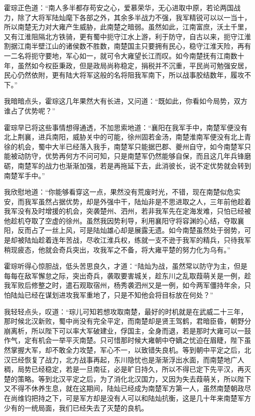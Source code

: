霍琮正色道：“南人多半都存苟安之心，爱慕荣华，无心进取中原，若论两国战力，除了大将军陆灿麾下各部之外，其余多半战力不强，我军精锐可以以一当十，所以南楚无力对大雍产生威胁，此南楚之暗弱。虽然如此，江南富庶，沃土千里，又有江淮阻隔北方铁骑，更有蜀中扼守江水上游，利于防守，自古以来，扼守江淮割据江南半壁江山的诸侯数不胜数，南楚国主只要拥有民心，稳守江淮天险，再有一二名将扼守要地，军心如一，就可令大雍望长江而叹。如今南楚抚有江南数十年，虽然如今权臣秉政，但是政局尚称稳定，捐税并不沉重，平民尚可勉强安居，民心仍然依附，更有陆大将军这般的名将阻我军南下，所以战事胶结数年，履攻不下。”

我暗暗点头，霍琮这几年果然大有长进，又问道：“既如此，你看如今局势，双方谁占了优势呢？”

霍琮早已将这些事情想得通透，不加思索地道：“襄阳在我军手中，南楚军便没有北上荆襄，进兵南阳，威胁关中的可能，徐州固若金汤，南楚淮南军便没有北上青徐的机会，蜀中大半已经落入我手，南楚军只能据巴郡、夔州自守，如今南楚军只能被动防守，优势再何方不问可知，只是南楚军仍然能够自保，而且这几年兵锋磨砺，南楚军的战力也渐渐加强，若是再拖延下去，此消彼长，说不定优势就会转到南楚军手中。”

我欣慰地道：“你能够看穿这一点，果然没有荒废时光，不错，现在南楚似危实安，而我军虽然占据优势，却是外强中干，陆灿非是不思进取之人，三年前他趁着我军没有及时增援的机会，突袭楚州、泗州，若非我军先在定海发难，只怕已经被他趁机夺取了空虚的徐州。虽然我因势利导，利用襄阳守将容渊的心结，夺取襄阳，反而占了一丝上风，可是陆灿雄心却是展露无遗。如今南楚虽然处于弱势，可是却被陆灿趁着连年苦战，尽收江淮兵权，练就一支不逊于我军的精兵，只待我军稍现疲态，他就会奇兵突出，攻我军之不备，将大雍平楚的努力化为乌有。”

霍琮听得心惊胆战，低头苦思良久，才道：“陆灿为战，虽然常以防守为主，但是每每在敌军懈怠之际，突出奇兵，袭取要害城关，趁东川之乱取葭萌关是一例，趁我军败后修整之时，遣石观取宿州，杨秀袭泗州又是一例，如今两军僵持年余，只怕陆灿已经在谋划进攻我军重地了，只是不知他会将目标放在何处？”

我轻轻点头，叹道：“琮儿可知若想攻取南楚，最好的时机就是在武威二十三年，那时候北汉新败，蜀中尚没有完全平定，而南楚却是贤王驾鹤，君暗臣昏，朝野分崩离析，所以陛下可以率大军破建业，俘国主，全身而退，若是那时大雍可以一鼓作气，定有机会一举平灭南楚。只可惜那时候大雍朝中夺嫡之忧迫在眉睫，陛下虽然掌握大军，却不敢全力攻楚，军心不一，以致错失良机。等到朝中平定之后，北汉已经恢复了战力，北方战事再起，东川隐忧也是渐渐浮出水面，而南楚地广人稠，局势已经稳定，若是一旦南征，必是旷日持久，所以不得已定下先平汉，再灭楚的策略。等到北汉平定之后，为了消化北汉国力，又因为失去葭萌关，所以陛下又不得不休养生息，就在这期间，陆灿已经成为南楚军方第一人，虽然南楚朝政尽在尚维钧把持之下，可是军方却是没有人可以和陆灿抗衡，这是几十年来南楚军方少有的一统局面，我们已经失去了灭楚的良机。

